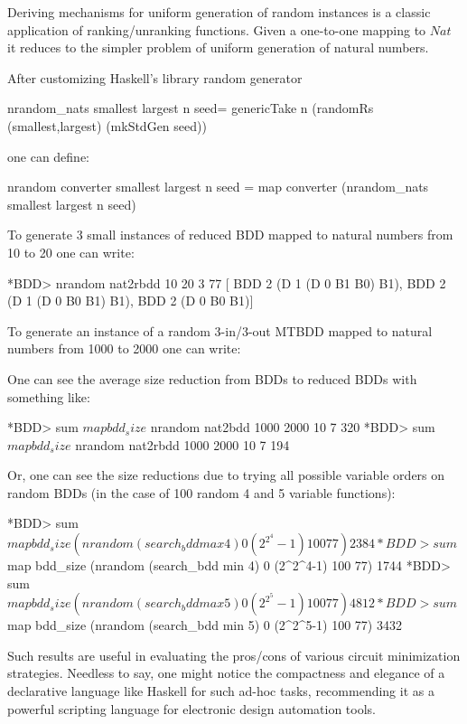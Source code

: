 \documentclass[]{INCLUDES/llncs}
\begin{document}
Deriving mechanisms for uniform generation of random instances
is a classic application of ranking/unranking functions.
Given a one-to-one mapping to $Nat$ it reduces
to the simpler problem of uniform generation of
natural numbers.

After customizing Haskell's library random generator
\begin{code}
nrandom_nats smallest largest n seed= 
  genericTake n 
    (randomRs (smallest,largest) (mkStdGen seed))
\end{code}
one can define:
\begin{code}
nrandom converter smallest largest n seed =
  map converter (nrandom_nats smallest largest n seed)
\end{code}

To generate 3 small instances of reduced BDD mapped to
natural numbers from 10 to 20 one can write:
\begin{codex}
*BDD> nrandom nat2rbdd 10 20 3 77
[ BDD 2 (D 1 (D 0 B1 B0) B1),
  BDD 2 (D 1 (D 0 B0 B1) B1),
  BDD 2 (D 0 B0 B1)]
\end{codex}

To generate an instance of a random 3-in/3-out MTBDD mapped to
natural numbers from 1000 to 2000 one can write:
One can see the average size reduction from
BDDs to reduced BDDs with something like:
\begin{codex}
*BDD> sum $ map bdd_size $ nrandom nat2bdd 1000 2000 10 7
320
*BDD> sum $ map bdd_size $ nrandom nat2rbdd 1000 2000 10 7
194
\end{codex}
Or, one can see the size reductions due to trying
all possible variable orders on random BDDs (in the case of 100 random 4 and 5
variable functions):
\begin{codex}
*BDD> sum $ map bdd_size (nrandom (search_bdd max 4) 0 (2^2^4-1) 100 77)
2384
*BDD> sum $ map bdd_size (nrandom (search_bdd min 4) 0 (2^2^4-1) 100 77)
1744
*BDD> sum $ map bdd_size (nrandom (search_bdd max 5) 0 (2^2^5-1) 100 77)
4812
*BDD> sum $ map bdd_size (nrandom (search_bdd min 5) 0 (2^2^5-1) 100 77)
3432
\end{codex}
Such results are useful in evaluating the pros/cons of various circuit
minimization strategies. 
Needless to say, one might notice the compactness and elegance of a
declarative language like Haskell for such ad-hoc tasks, 
recommending it as a powerful scripting language for 
electronic design automation tools.
\end{document}
